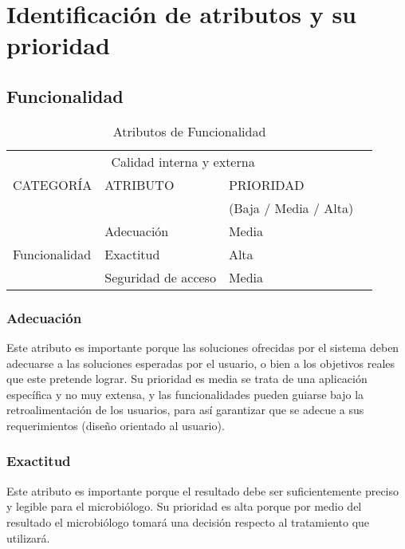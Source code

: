 \documentclass[12pt]{article}
\begin{document}
\section{Identificación de atributos y su prioridad}

\subsection{Funcionalidad}
\vspace*{0.3in}
\begin{table}[htb]%
\centering
\begin{tabular}{|l|l|l|l|}
\hline
\multicolumn{3}{|c|}{Calidad interna y externa   } \\
\cline{1-3}
CATEGORÍA & ATRIBUTO & PRIORIDAD\\ & & (Baja / Media / Alta)\\
\hline \hline
\multirow{3}{3cm}{Funcionalidad} & Adecuación & Media \\ \cline{2-3}
& 
Exactitud &  
Alta\\ \cline{2-3}
& Seguridad de acceso & Media\\ \cline{1-3}
\end{tabular}
\caption{Atributos de Funcionalidad}
\label{tabla:final}
\end{table}%
\subsubsection{Adecuación}
\vspace*{0.2in}
Este atributo es importante porque las soluciones ofrecidas por el sistema deben adecuarse a las soluciones esperadas por el usuario, o bien a los objetivos reales que este pretende lograr. Su prioridad es media se trata de una aplicación específica y no muy extensa, y las funcionalidades pueden guiarse bajo la retroalimentación de los usuarios, para así garantizar que se adecue a sus requerimientos (diseño orientado al usuario).
\subsubsection{Exactitud}
\vspace*{0.2in}
Este atributo es importante porque el resultado debe ser suficientemente preciso y legible para el microbiólogo. Su prioridad es alta porque por medio del resultado el microbiólogo tomará una decisión respecto al tratamiento que utilizará.
\end{document}
